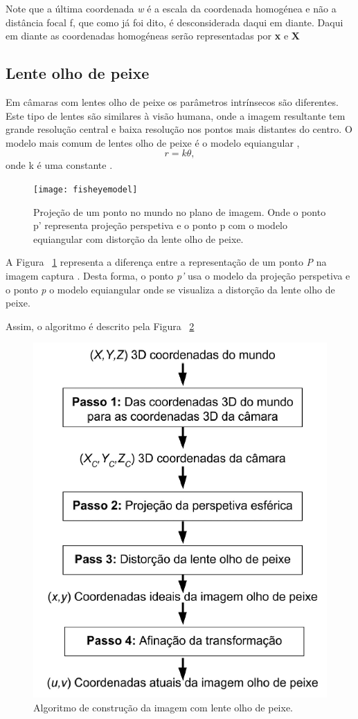 Note que a última coordenada \textit{w} é a escala da coordenada homogénea e não a distância focal f, que como já foi dito, é desconsiderada daqui em diante. Daqui em diante as coordenadas homogéneas serão representadas por \textbf{x} e \textbf{X} 


\subsection{Lente olho de peixe}

Em câmaras com lentes olho de peixe os parâmetros intrínsecos são diferentes. Este tipo de lentes são similares à visão humana, onde a imagem resultante tem grande resolução central e baixa resolução nos pontos mais distantes do centro. O modelo mais comum de lentes olho de peixe é o modelo equiangular ,  \[ r = k \theta ,  \] onde k é uma constante \cite{Hansen2009}.

\begin{figure}[h!] %
	\begin{center}
		\leavevmode		
		\texttt{[image: fisheyemodel]}
		\caption{Projeção de um ponto no mundo no plano de imagem. Onde o ponto p' representa projeção perspetiva e o ponto p com o modelo equiangular com distorção da lente olho de peixe. \cite{Srestasathiern2014,Kannala2004}}
		\label{fig:fishvspinhole} 
	\end{center}
\end{figure}

A Figura ~\ref{fig:fishvspinhole} representa a diferença entre a representação de um ponto \textit{P} na imagem captura . Desta forma, o ponto \textit{p'} usa o modelo da projeção perspetiva e o ponto \textit{p} o modelo equiangular onde se visualiza a distorção da lente olho de peixe.

Assim, o algoritmo é descrito pela Figura ~\ref{fig:fisheyealgortim}

\begin{figure}[h!]
	\centering
	\includegraphics[width=0.4\linewidth]{figures/fisheyealgortimpt}
	\caption{Algoritmo de construção da imagem com lente olho de peixe. \cite{Ying2006}}
	\label{fig:fisheyealgortim}
\end{figure}

